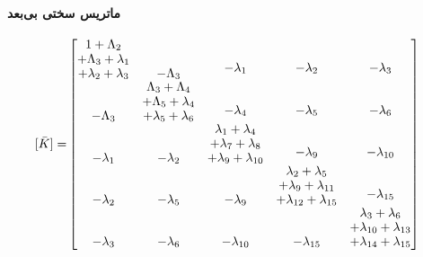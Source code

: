 \paragraph{ماتریس سختی بی‌بعد}
\begin{equation}\label{Eq.stiffness_matrix_dimensionless}
\begin{aligned}
[\bar{K}] =& 
\begin{bmatrix}
\shortstack{$1 + \Lambda_2$ \\ $+ \Lambda_3 + \lambda_1$ \\ $+ \lambda_2 + \lambda_3$} & -\Lambda_3 & \shortstack{$-\lambda_1$ \\ \,} & \shortstack{$-\lambda_2$ \\ \,} & \shortstack{$-\lambda_3$ \\ \,} \\
-\Lambda_3 & \shortstack{$\Lambda_3 + \Lambda_4$ \\ $+ \Lambda_5 + \lambda_4$ \\ $+ \lambda_5 + \lambda_6$} & \shortstack{$-\lambda_4$ \\ \,} & \shortstack{$-\lambda_5$ \\ \,} & \shortstack{$-\lambda_6$ \\ \,} \\
-\lambda_1 & -\lambda_2 & \shortstack{$\lambda_1 + \lambda_4$ \\ $+ \lambda_7 + \lambda_8$ \\ $+ \lambda_9 + \lambda_{10}$} & \shortstack{$-\lambda_9$ \\ \,} & \shortstack{$-\lambda_{10}$ \\ \,} \\
-\lambda_2 & -\lambda_5 & -\lambda_9 & \shortstack{$\lambda_2 + \lambda_5$ \\ $+ \lambda_9 + \lambda_{11}$ \\ $+ \lambda_{12} + \lambda_{15}$} & \shortstack{$-\lambda_{15}$ \\ \,} \\
-\lambda_3 & -\lambda_{6} & -\lambda_{10} & -\lambda_{15} & \shortstack{$\lambda_3 + \lambda_6$ \\ $+ \lambda_{10} + \lambda_{13}$ \\ $+ \lambda_{14} + \lambda_{15}$}
\end{bmatrix}
\end{aligned}
\end{equation}
